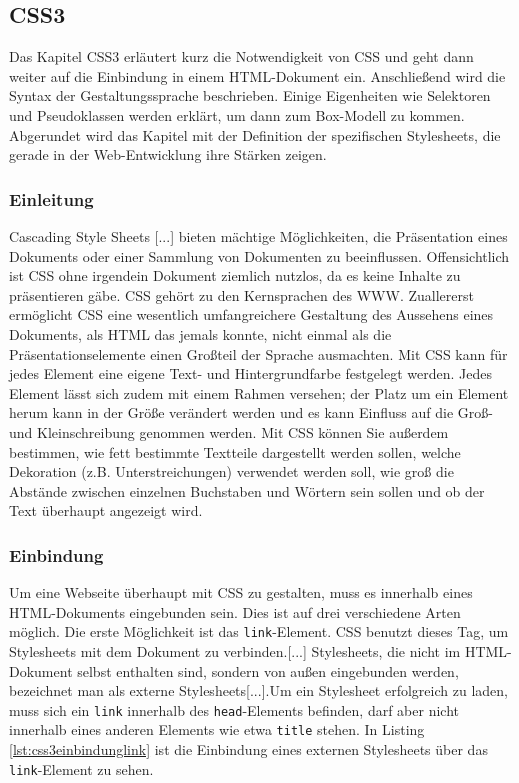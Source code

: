 \subsection{CSS3}
Das Kapitel CSS3 erläutert kurz die Notwendigkeit von CSS und geht dann weiter auf die Einbindung in einem HTML-Dokument ein. Anschließend wird die Syntax der Gestaltungssprache beschrieben. Einige Eigenheiten wie Selektoren und Pseudoklassen werden erklärt, um dann zum Box-Modell zu kommen. Abgerundet wird das Kapitel mit der Definition der spezifischen Stylesheets, die gerade in der Web-Entwicklung ihre Stärken zeigen.

\subsubsection{Einleitung}
\glqq Cascading Style Sheets [...] bieten mächtige Möglichkeiten, die Präsentation eines Dokuments oder einer Sammlung von Dokumenten zu beeinflussen. Offensichtlich ist CSS ohne irgendein Dokument ziemlich nutzlos, da es keine Inhalte zu präsentieren gäbe.\grqq{}\cite[S.1]{MeyeCasc2005} CSS gehört zu den Kernsprachen des WWW. \glqq Zuallererst ermöglicht CSS eine wesentlich umfangreichere Gestaltung des Aussehens eines Dokuments, als HTML das jemals konnte, nicht einmal als die Präsentationselemente einen Großteil der Sprache ausmachten. Mit CSS kann für jedes Element eine eigene Text- und Hintergrundfarbe festgelegt werden. Jedes Element lässt sich zudem mit einem Rahmen versehen; der Platz um ein Element herum kann in der Größe verändert werden und es kann Einfluss auf die Groß- und Kleinschreibung genommen werden. Mit CSS können Sie außerdem bestimmen, wie fett bestimmte Textteile dargestellt werden sollen, welche Dekoration (z.B. Unterstreichungen) verwendet werden soll, wie groß die Abstände zwischen einzelnen Buchstaben und Wörtern sein sollen und ob der Text überhaupt angezeigt wird.\grqq{}\cite[S.4]{MeyeCasc2005}

\subsubsection{Einbindung} Um eine Webseite überhaupt mit CSS zu gestalten, muss es innerhalb eines HTML-Dokuments eingebunden sein. Dies ist auf drei verschiedene Arten möglich. Die erste Möglichkeit ist das \texttt{link}-Element. \glqq CSS benutzt dieses Tag, um Stylesheets mit dem Dokument zu verbinden.[...] Stylesheets, die nicht im HTML-Dokument selbst enthalten sind, sondern von außen eingebunden werden, bezeichnet man als externe Stylesheets[...].Um ein Stylesheet erfolgreich zu laden, muss sich ein \texttt{link} innerhalb des \texttt{head}-Elements befinden, darf aber nicht innerhalb eines anderen Elements wie etwa \texttt{title} stehen.\grqq{}\cite[S.14]{MeyeCasc2005} In Listing \ref{lst:css3einbindunglink} ist die Einbindung eines externen Stylesheets über das \texttt{link}-Element zu sehen.
	
